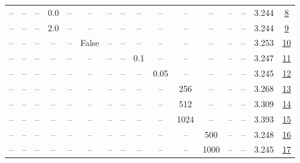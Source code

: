 \begin{table}[H]
\begin{tabular}{cccccccccccccccc}
-- & -- & -- & 0.0 & -- & -- & -- & -- & -- & -- & -- & -- & -- & -- & 3.244 & \href{https://wandb.ai/stanford-mercury/optimizer-scaling/runs/sweep-300m-6B-kronedc5a1lr0.001-wd0.5-b10.95-plr0.2-pis1-gn0.0-n-736741}{8} \\
-- & -- & -- & 2.0 & -- & -- & -- & -- & -- & -- & -- & -- & -- & -- & 3.244 & \href{https://wandb.ai/stanford-mercury/optimizer-scaling/runs/sweep-300m-6B-krona55554lr0.001-wd0.5-b10.95-plr0.2-pis1-gn2.0-n-2b58f3}{9} \\
-- & -- & -- & -- & -- & False & -- & -- & -- & -- & -- & -- & -- & -- & 3.253 & \href{https://wandb.ai/stanford-mercury/optimizer-scaling/runs/sweep-300m-6B-kronbd9170lr0.001-wd0.5-b10.95-plr0.2-pis1-gn1-nor-0add5a}{10} \\
-- & -- & -- & -- & -- & -- & -- & -- & 0.1 & -- & -- & -- & -- & -- & 3.247 & \href{https://wandb.ai/stanford-mercury/optimizer-scaling/runs/sweep-300m-6B-kron2dfba4lr0.001-wd0.5-b10.95-plr0.1-pis1-gn1-nor-276c3b}{11} \\
-- & -- & -- & -- & -- & -- & -- & -- & -- & 0.05 & -- & -- & -- & -- & 3.245 & \href{https://wandb.ai/stanford-mercury/optimizer-scaling/runs/sweep-300m-6B-kron79a66dlr0.001-wd0.5-b10.95-plr0.2-pis1-gn1-nor-11f4a3}{12} \\
-- & -- & -- & -- & -- & -- & -- & -- & -- & -- & 256 & -- & -- & -- & 3.268 & \href{https://wandb.ai/stanford-mercury/optimizer-scaling/runs/sweep-300m-6B-kron3e44e0lr0.001-wd0.5-b10.95-plr0.2-pis1-gn1-nor-e9e4f3}{13} \\
-- & -- & -- & -- & -- & -- & -- & -- & -- & -- & 512 & -- & -- & -- & 3.309 & \href{https://wandb.ai/stanford-mercury/optimizer-scaling/runs/sweep-300m-6B-krond7d67alr0.001-wd0.5-b10.95-plr0.2-pis1-gn1-nor-85324c}{14} \\
-- & -- & -- & -- & -- & -- & -- & -- & -- & -- & 1024 & -- & -- & -- & 3.393 & \href{https://wandb.ai/stanford-mercury/optimizer-scaling/runs/sweep-300m-6B-kron8b18a1lr0.001-wd0.5-b10.95-plr0.2-pis1-gn1-nor-4605e0}{15} \\
-- & -- & -- & -- & -- & -- & -- & -- & -- & -- & -- & 500 & -- & -- & 3.248 & \href{https://wandb.ai/stanford-mercury/optimizer-scaling/runs/sweep-300m-6B-krondc1418lr0.001-wd0.5-b10.95-plr0.2-pis1-gn1-nor-f0e290}{16} \\
-- & -- & -- & -- & -- & -- & -- & -- & -- & -- & -- & 1000 & -- & -- & 3.245 & \href{https://wandb.ai/stanford-mercury/optimizer-scaling/runs/sweep-300m-6B-krona5b2cclr0.001-wd0.5-b10.95-plr0.2-pis1-gn1-nor-c5851e}{17} \\

\end{tabular}
\end{table}

